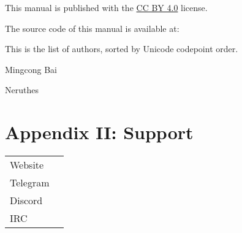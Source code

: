     This manual is published with the \underline{CC BY 4.0} license.

    The source code of this manual is available at:\newline
    \hspace{2em}

    \vspace{1ex}This is the list of authors, sorted by Unicode codepoint order.

    \begin{compactitem}
        \item Mingcong Bai
        \item Neruthes
    \end{compactitem}

    \section{Appendix II: Support}

    \begin{tabu} {lX}
        Website &  \\
        Telegram &  \\
        Discord &  \\
        IRC &  \\
    \end{tabu}





    \clearpage
    \pagestyle{empty}

    \makebackcoverpage
